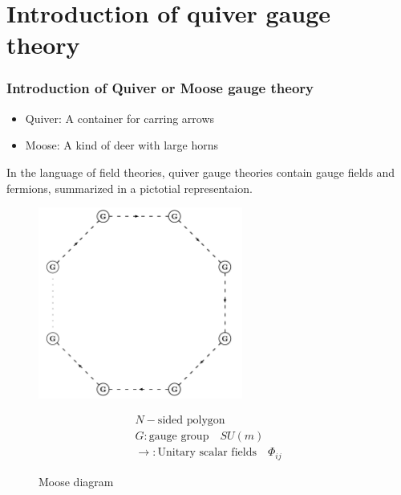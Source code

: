 \documentclass{beamer}
\begin{document}
\section{Introduction of quiver gauge theory}
\begin{frame}
    \frametitle{Introduction of Quiver or Moose gauge theory}
    \begin{itemize}
        \item Quiver: A container for carring arrows
        \item Moose: A kind of deer with large horns 
    \end{itemize}
    

    In the language of field theories, quiver gauge theories contain gauge fields and fermions, summarized in a pictotial representaion.
    \begin{figure}
        \centering
        \begin{minipage}{0.45\textwidth}
            \centering
            \includegraphics[width=0.6\textwidth]{Moosed.jpeg}
            \caption*{Moose diagram}
        \end{minipage}
        \hspace{1em}
        \begin{minipage}{0.3\textwidth}
            \begin{gather*}
                N-\text{sided polygon}\\
                G: \text{gauge group} \quad SU(m)\\
                \rightarrow : \text{Unitary scalar fields}\quad \Phi_{ij} 
            \end{gather*}
        \end{minipage}
        
    \end{figure}
\end{frame}
\end{document}

